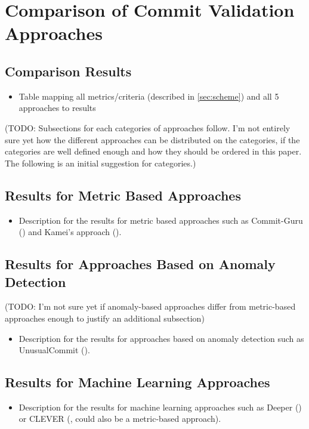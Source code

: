 \section{Comparison of Commit Validation Approaches}

\subsection{Comparison Results}
\begin{itemize}
	\item Table mapping all metrics/criteria (described in \ref{sec:scheme}) and all 5 approaches to results
\end{itemize}

(TODO: Subsections for each categories of approaches follow. I'm not entirely sure yet how the different approaches can be distributed on the categories, if the categories are well defined enough and how they should be ordered in this paper. The following is an initial suggestion for categories.)
\subsection{Results for Metric Based Approaches}
\begin{itemize}
	\item Description for the results for metric based approaches such as Commit-Guru (\cite{Nayrolles2018}) and Kamei's approach (\cite{Kamei2013}).
\end{itemize}
\subsection{Results for Approaches Based on Anomaly Detection}
(TODO: I'm not sure yet if anomaly-based approaches differ from metric-based approaches enough to justify an additional subsection)
\begin{itemize}
\item Description for the results for approaches based on anomaly detection such as UnusualCommit (\cite{Goyal2017}).
\end{itemize}
\subsection{Results for Machine Learning Approaches}
\begin{itemize}
\item Description for the results for machine learning approaches such as Deeper (\cite{Yang2015}) or CLEVER (\cite{Nayrolles2018}, could also be a metric-based approach).
\end{itemize}



